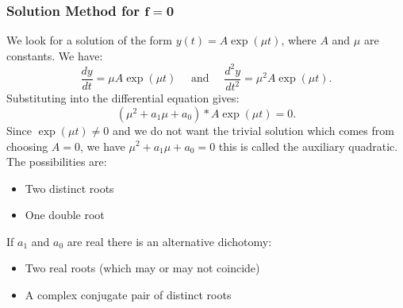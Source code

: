 \subsubsection*{Solution Method for $\mathbf{f = 0}$}
We look for a solution of the form $y(t) = A\exp(\mu t)$, where $A$ and $\mu$ are constants. We have: $$\frac{dy}{dt} = \mu A\exp(\mu t) \quad \mbox{      and      } \quad \frac{d^2y}{dt^2} = \mu^2 A \exp(\mu t).$$
Substituting into the differential equation gives: $$(\mu^2 + a_1\mu + a_0) * A\exp(\mu t) = 0.$$
Since $\exp(\mu t ) \not = 0$ and we do not want the trivial solution which comes from choosing $ A = 0$, we have $\mu^2 + a_1\mu +a_0 = 0$ this is called the auxiliary quadratic. The possibilities are:
\begin{itemize}
\item Two distinct roots
\item One double root
\end{itemize}
If $a_1$ and $a_0$ are real there is an alternative dichotomy: 
\begin{itemize}
\item Two real roots (which may or may not coincide)
\item A complex conjugate pair of distinct roots
\end{itemize}
